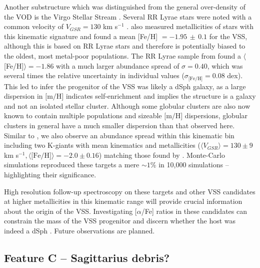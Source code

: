 \documentclass[preprint2]{aastex}
\begin{document}
	Another substructure which was distinguished from the general over-density of the VOD is the Virgo Stellar Stream \citep{Duffau;et-al_2006}. Several RR Lyrae stars were noted with a common velocity of $V_{GSR} = 130$ km s$^{-1}$ \citep{Newberg;et-al_2007, Prior;et-al_2009a}. \citet{Prior;et-al_2009a} also measured metallicities of stars with this kinematic signature and found a mean [Fe/H] $= -1.95\,\pm\,0.1$ for the VSS, although this is based on RR Lyrae stars and  therefore is potentially biased to the oldest, most metal-poor populations. The RR Lyrae sample from \citet{Duffau;et-al_2006} found a $\langle$[Fe/H]$\rangle = -1.86$ with a much larger abundance spread of $\sigma = 0.40$, which was several times the relative uncertainty in individual values ($\sigma_{\mbox{[Fe/H]}} = 0.08$ dex). This led \citet{Duffau;et-al_2006} to infer the progenitor of the VSS was likely a dSph galaxy, as a large dispersion in $\mbox{[m/H]}$ indicates self-enrichment and implies the structure is a galaxy and not an isolated stellar cluster. Although some globular clusters are also now known to contain multiple populations and sizeable $\mbox{[m/H]}$ dispersions, globular clusters in general  have a much smaller dispersion than that observed here. Similar to \citet{Duffau;et-al_2006}, we  also observe an abundance spread within this kinematic bin including two K-giants with mean kinematics and metallicities ($\langle{}V_{GSR}\rangle{} = 130 \pm 9$ km s$^{-1}, \langle\mbox{[Fe/H]}\rangle = -2.0 \pm 0.16$) matching those found by \citet{Prior;et-al_2009a}. Monte-Carlo simulations reproduced these targets a mere $\sim1$\% in 10,000 simulations \--- highlighting their significance.

	High resolution follow-up spectroscopy on these targets and other VSS candidates at higher metallicities in this kinematic range will provide crucial information about the origin of the VSS.  Investigating [$\alpha$/Fe] ratios in these candidates can constrain the mass of the VSS progenitor and discern whether the host was indeed a dSph \citep{Venn;et-al_2004, Casetti-Dinescu;et-al_2009}.  Future observations are planned.

	\subsection{Feature C \--- Sagittarius debris?}
	\label{sec:feature-c}
\end{document}
